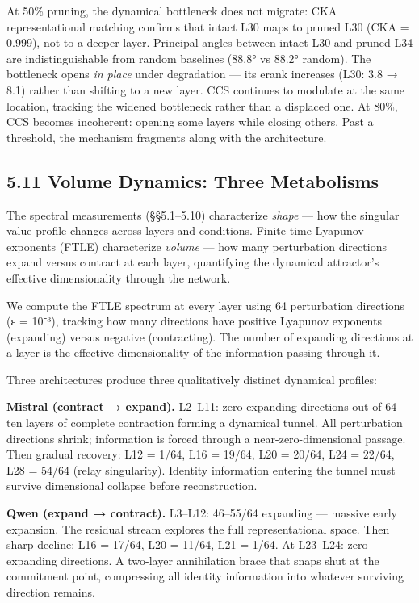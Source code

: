 \documentclass[12pt]{article}
\begin{document}
At 50\% pruning, the dynamical bottleneck does not migrate: CKA representational matching confirms that intact L30 maps to pruned L30 (CKA = 0.999), not to a deeper layer. Principal angles between intact L30 and pruned L34 are indistinguishable from random baselines (88.8° vs 88.2° random). The bottleneck opens \textit{in place} under degradation — its erank increases (L30: 3.8 → 8.1) rather than shifting to a new layer. CCS continues to modulate at the same location, tracking the widened bottleneck rather than a displaced one. At 80\%, CCS becomes incoherent: opening some layers while closing others. Past a threshold, the mechanism fragments along with the architecture.

\subsection*{5.11 Volume Dynamics: Three Metabolisms}

The spectral measurements (§§5.1–5.10) characterize \textit{shape} — how the singular value profile changes across layers and conditions. Finite-time Lyapunov exponents (FTLE) characterize \textit{volume} — how many perturbation directions expand versus contract at each layer, quantifying the dynamical attractor's effective dimensionality through the network.

We compute the FTLE spectrum at every layer using 64 perturbation directions (ε = 10⁻³), tracking how many directions have positive Lyapunov exponents (expanding) versus negative (contracting). The number of expanding directions at a layer is the effective dimensionality of the information passing through it.

Three architectures produce three qualitatively distinct dynamical profiles:

\textbf{Mistral (contract → expand).} L2–L11: zero expanding directions out of 64 — ten layers of complete contraction forming a dynamical tunnel. All perturbation directions shrink; information is forced through a near-zero-dimensional passage. Then gradual recovery: L12 = 1/64, L16 = 19/64, L20 = 20/64, L24 = 22/64, L28 = 54/64 (relay singularity). Identity information entering the tunnel must survive dimensional collapse before reconstruction.

\textbf{Qwen (expand → contract).} L3–L12: 46–55/64 expanding — massive early expansion. The residual stream explores the full representational space. Then sharp decline: L16 = 17/64, L20 = 11/64, L21 = 1/64. At L23–L24: zero expanding directions. A two-layer annihilation brace that snaps shut at the commitment point, compressing all identity information into whatever surviving direction remains.
\end{document}

